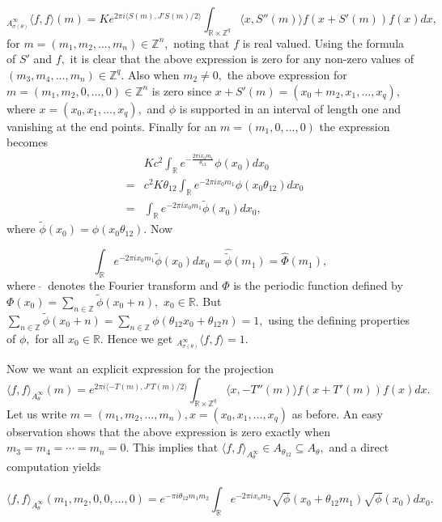 \documentclass[9pt, BCOR=2mm]{amsart}
\numberwithin{equation}{section}
\numberwithin{equation}{section}
\newcommand{\Z}{{\mathbb{Z}}}
\newcommand{\R}{{\mathbb{R}}}
\begin{document}
$$_{A^\infty_{\sigma(\theta)}}\langle f,f\rangle(m)=Ke^{2\pi i\langle S(m),J'S(m)\slash2\rangle}\int_{\R \times \Z^q}\langle x,S''(m)\rangle f(x+S'(m))f(x)dx,$$ for $m=(m_1,m_2,\ldots,m_n) \in \Z^n,$ noting that $f$ is real valued. Using the formula of $S'$ and $f,$ it is clear that the above expression is zero for any non-zero values of $(m_3,m_4,\ldots,m_n)\in \Z^q.$ Also when $m_2\neq 0,$ the above expression for $m=(m_1,m_2,0,\ldots,0)\in \Z^n$ is zero since $x+S'(m)= (x_0+m_2,x_1,\ldots,x_q),$ where $x=(x_0,x_1,\ldots,x_q),$ and $\phi$ is supported in an interval of length one and vanishing at the end points. Finally for an $m= (m_1,0,\ldots,0)$ the expression becomes
\begin{eqnarray*}
&&Kc^2\int_{\R}e^{-\frac{2\pi ix_0 m_1} {\theta_{12}}}\phi(x_0)dx_0\\
&=&c^2K\theta_{12}\int_{\R}e^{-2\pi ix_0 m_1}\phi(x_0\theta_{12})dx_0\\
&=&\int_{\R}e^{-2\pi ix_0 m_1}\widetilde{\phi}(x_0)dx_0,
\end{eqnarray*}
where $\widetilde{\phi}(x_0)=\phi(x_0\theta_{12}).$ Now

$$\int_{\R}e^{-2\pi ix_0 m_1}\widetilde{\phi}(x_0)dx_0=\widehat{\tilde{\phi}}(m_1)=\widehat{\Phi}(m_1),$$
where $~\widehat{}~$ denotes the Fourier transform and $\Phi$ is the periodic function defined by $\Phi(x_0)= \sum\limits_{n\in \Z} \widetilde{\phi}(x_0+n),$ $x_0\in \R.$ But $\sum\limits_{n\in \Z} \widetilde{\phi}(x_0+n)=\sum\limits_{n\in \Z} \phi(\theta_{12}x_0+\theta_{12}n)=1,$ using the defining properties of $\phi,$ for all $x_0\in \R.$ Hence we get $_{A^\infty_{\sigma(\theta)}}\langle f,f\rangle=1.$


Now we want an explicit expression for the projection
 $$\langle f,f\rangle_{A^\infty_{\theta}}(m)=e^{2\pi i\langle -T(m),J'T(m)\slash2\rangle}\int_{\R \times \Z^q}\langle x,-T''(m)\rangle f(x+T'(m))f(x)dx.$$ Let us write $m=(m_1,m_2,\ldots,m_n), x=(x_0,x_1,\ldots,x_q)$ as before. An easy observation shows that the above expression is zero exactly when $m_3=m_4=\cdots =m_n=0.$ This implies that $\langle f,f\rangle_{A^\infty_{\theta}}\in A_{\theta_{12}}\subseteq A_{\theta},$ and a direct computation yields 
 
\begin{equation}\label{eq:rieffel_projection_explicit}
	\langle f,f\rangle_{A^\infty_{\theta}}(m_1,m_2,0,0,\ldots,0)=e^{-\pi i\theta_{12}m_1m_2}\int_{\R}e^{-2\pi ix_om_2} \sqrt{\phi}(x_0+\theta_{12}m_1)\sqrt{\phi}(x_0)dx_0.
\end{equation}
\end{document}
